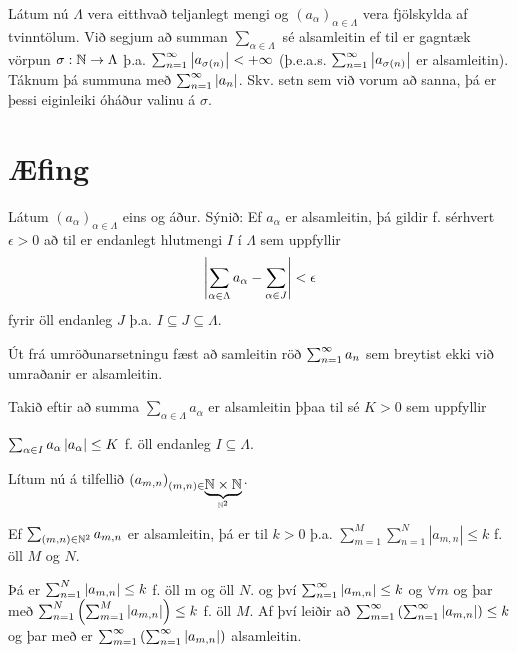 \documentclass[12pt]{book} \usepackage[utf8]{inputenc}
\begin{document}
Látum nú $\Lambda$ vera eitthvað teljanlegt mengi og
$(a_{\alpha})_{\alpha \in \Lambda}$ vera fjölskylda af tvinntölum. Við
segjum að summan $\sum_{\alpha \in \Lambda}$ sé alsamleitin ef til er
gagntæk vörpun $\sigma: \mathbb{N} \to \Lambda$ þ.a.
$\sum_{n = 1}^{\infty} \left|a_{\sigma(n)}\right| < +\infty$ (þ.e.a.s.
$\sum_{n = 1}^{\infty} \left|a_{\sigma(n)}\right|$ er alsamleitin). Táknum þá summuna
með $\sum_{n = 1}^{\infty} \left|a_n\right|$. Skv. setn sem við vorum að sanna, þá er
þessi eiginleiki óháður valinu á $\sigma$.


\section*{Æfing}

Látum $(a_{\alpha})_{\alpha \in \Lambda}$ eins og áður. Sýnið: Ef
$a_{\alpha}$ er alsamleitin, þá gildir f. sérhvert $\epsilon > 0$ að
til er endanlegt hlutmengi $I$ í $\Lambda$ sem uppfyllir
\[ \left|\sum_{\alpha \in \Lambda} a_{\alpha} - \sum_{\alpha \in J} \right| <
\epsilon \]
fyrir öll endanleg $J$ þ.a. $I \subseteq J \subseteq \Lambda $.

\begin{ath} Út frá umröðunarsetningu fæst að samleitin röð
  $\sum_{n = 1}^{\infty} a_n$ sem breytist ekki við umraðanir er alsamleitin.

  { \def\aal{a_{\alpha}} \def\aall{(\aal)_{\alpha \in \Lambda}}
    \def\saal{\sum_{\alpha \in \Lambda} a_{\alpha}}

    \newcommand{\sal}[1]{\sum_{\alpha \in #1} a_{\alpha } }

    Takið eftir að summa $\saal$ er alsamleitin þþaa til sé $ K > 0$
    sem uppfyllir

    $\sal{I} \abs{\aal} \leq K$ f. öll endanleg $I \subseteq \Lambda$.

    \def\mn{(m,n)} \def\amn{a_{m,n}} Lítum nú á tilfellið
    $(\amn)_{\mn \in \underbrace{\N \times \N}_{\N^2}}$.

    Ef $\sum_{\mn \in \N^2} \amn$ er alsamleitin, þá er til $k > 0$
    þ.a.  $\sum_{m=1}^M \sum_{n=1}^N | \amn| \leq k$ f. öll $M$ og
    $N$.

    Þá er $\sum_{n=1}^N \abs{\amn} \leq k$ f. öll m og öll $N$. og því
    $\sumoinfty \abs{\amn} \leq k$ og $\forall m$ og þar með
    $\sum_{n=1}^N \left(\sum_{m=1}^M \abs{\amn}\right) \leq k$ f. öll
    $M$. Af því leiðir að
    $\sum_{m=1}^{\infty} \left( \sumoinfty \abs{\amn} \right) \leq k$
    og þar með er
    $\sum_{m=1}^{\infty} \left( \sumoinfty \abs{\amn} \right)$
    alsamleitin.  }

\end{ath}
\end{document}
